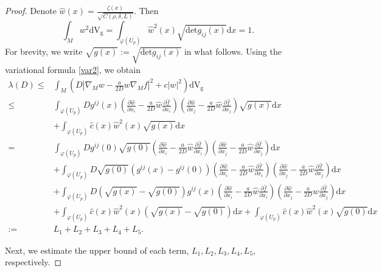 \documentclass[12pt,reqno]{amsart}
\newcommand{\V}{\mathrm{d} \mathrm{V_g}}
\numberwithin{equation}{section}
\begin{document}
\begin{proof}
Denote $\hat{w}(x)=\frac{\zeta(x)}{\sqrt{C(\rho,\delta,L)}}$. Then $$\int_M w^2 \V=\int_{\varphi(U_p)}\hat{w}^2(x)\sqrt{\mathrm{det}g_{ij}(x)}\mathrm{d} x=1.$$  For brevity, we write $\sqrt{g(x)}:=\sqrt{\mathrm{det}g_{ij}(x)}$ in what follows. Using the variational formula \eqref{var2}, we obtain
\begin{align}\label{I:upe}
  \lambda(D)\leq & \int_M  \left(D|\nabla_{M} w-\frac{a}{2 D} w\nabla_{M} f|^2 +c |w|^2 \right)\mathrm{d} \mathrm{V_g}\nonumber\\
 \leq &\int_{\varphi(U_p)}  D g^{ij}(x)(\frac{\partial \hat{w}}{\partial x_i} -\frac{a}{2 D} \hat{w}\frac{\partial \hat{f}}{\partial x_i} )(\frac{\partial \hat{w}}{\partial x_j} -\frac{a}{2 D} \hat{w}\frac{\partial \hat{f}}{\partial x_j} )
 \sqrt{g(x)}\mathrm{d} x\nonumber\\
 &+\int_{\varphi(U_p)} \hat{c}(x) \hat{w}^2(x)
 \sqrt{g(x)}\mathrm{d} x
 \nonumber\\
 = &   \int_{\varphi(U_p)} D g^{i j}
  (0) \sqrt{g(0)}  \left( \frac{\partial \hat{w}}{\partial x_i} -
  \frac{a}{2D} \hat{w} \frac{\partial \hat{f}}{\partial x_i} \right)  \left(
  \frac{\partial \hat{w}}{\partial x_j} - \frac{a}{2D} \hat{w} \frac{\partial
  \hat{f}}{\partial x_j} \right)  \mathrm{d} x  \nonumber\\
  & + \int_{\varphi(U_p)} D \sqrt{g(0)}  (g^{i j} (x) - g^{i j} (0)) 
  \left( \frac{\partial \hat{w}}{\partial x_i} - \frac{a}{2D} \hat{w} \frac{\partial
  \hat{f}}{\partial x_i} \right)  \left( \frac{\partial \hat{w}}{\partial x_j} -
  \frac{a}{2D} \hat{w} \frac{\partial \hat{f}}{\partial x_j} \right)  \mathrm{d} x
  \nonumber\\
  & + \int_{\varphi(U_p)} D \left( \sqrt{g(x)}  - \sqrt{g(0)}  \right) g^{i j} (x) \left( \frac{\partial \hat{w}}{\partial x_i} -
  \frac{a}{2D} \hat{w} \frac{\partial \hat{f}}{\partial x_i} \right)  \left(
  \frac{\partial \hat{w}}{\partial x_j} - \frac{a}{2D} \hat{w} \frac{\partial
  \hat{f}}{\partial x_j} \right)  \mathrm{d} x \nonumber\\
   & +\int_{\varphi(U_p)} \hat{c}(x) \hat{w}^2(x)
 \left(\sqrt{g(x)} -\sqrt{g(0)} \right)\mathrm{d} x
 +\int_{\varphi(U_p)} \hat{c}(x) \hat{w}^2(x)
 \sqrt{g(0)} \mathrm{d} x
\nonumber\\
  := & L_1 + L_2 + L_3+L_4+L_5.
\end{align}

Next, we estimate the upper bound of each term, $L_1,L_2,L_3,L_4,L_5$, respectively. 


\end{proof}
\end{document}
